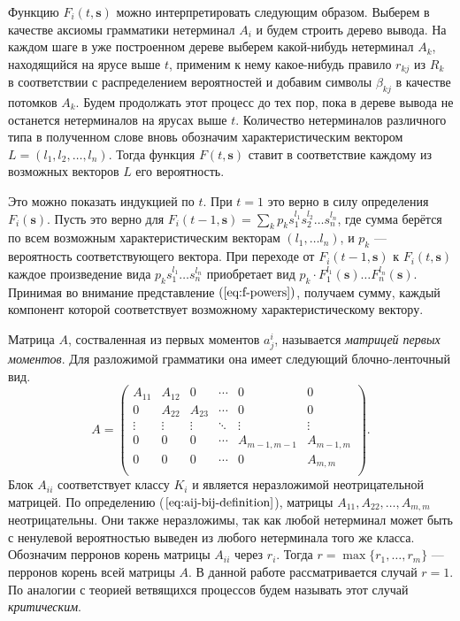 \documentclass[12pt]{article}
\begin{document}
Функцию $F_i(t, \mathbf{s})$ можно интерпретировать следующим образом. Выберем в качестве аксиомы грамматики нетерминал $A_i$ и будем строить дерево вывода. На каждом шаге в уже построенном дереве выберем какой-нибудь нетерминал $A_k$, находящийся на ярусе выше $t$, применим к нему какое-нибудь правило $r_{kj}$ из $R_k$ в соответствии с распределением вероятностей и добавим символы $\beta_{kj}$ в качестве потомков $A_k$. Будем продолжать этот процесс до тех пор, пока в дереве вывода не останется нетерминалов на ярусах выше $t$. Количество нетерминалов различного типа в полученном слове вновь обозначим характеристическим вектором $L = (l_1, l_2, \ldots, l_n)$. Тогда функция $F(t, \mathbf{s})$ ставит в соответствие каждому из возможных векторов $L$ его вероятность.

Это можно показать индукцией по $t$. При $t = 1$ это верно в силу определения $F_i(\mathbf{s})$. Пусть это верно для $F_i(t-1, \mathbf{s}) = \sum_k p_k s_1^{l_1} s_2^{l_2} \ldots s_n^{l_n}$, где сумма берётся по всем возможным характеристическим векторам $(l_1, \ldots l_n)$, и $p_k$ --- вероятность соответствующего вектора. При переходе от $F_i(t-1, \mathbf{s})$ к $F_i(t, \mathbf{s})$ каждое произведение вида $p_k s_1^{l_1} \ldots s_n^{l_n}$ приобретает вид $p_k \cdot F_1^{l_1}(\mathbf{s}) \ldots F_n^{l_n}(\mathbf{s})$. Принимая во внимание представление $(\ref{eq:f-powers})$, получаем сумму, каждый компонент которой соответствует возможному характеристическому вектору.

Матрица $A$, состваленная из первых моментов $a^i_j$, называется \textit{матрицей первых моментов}. Для разложимой грамматики она имеет следующий блочно-ленточный вид.
\begin{equation}
\label{eq:amatrix}
	A =
	\begin{pmatrix}
		A_{11} & A_{12} & 0      & \cdots & 0           & 0          \\
		0      & A_{22} & A_{23} & \cdots & 0           & 0          \\ 
		\vdots & \vdots & \vdots & \ddots & \vdots      & \vdots     \\
		0      & 0      & 0      & \cdots & A_{m-1,m-1} & A_{m-1, m} \\
		0      & 0      & 0      & \cdots & 0           & A_{m,m}    \\
	\end{pmatrix}.
\end{equation}
Блок $A_{ii}$ соответствует классу $K_i$ и является неразложимой неотрицательной матрицей. По определению ($\ref{eq:aij-bij-definition}$), матрицы $A_{11}, A_{22}, \ldots, A_{m,m}$ неотрицательны. Они также неразложимы, так как любой нетерминал может быть с ненулевой вероятностью выведен из любого нетерминала того же класса. Обозначим перронов корень \cite{gantmaher-matrix-theory} матрицы $A_{ii}$ через $r_i$. Тогда $r = \max\{r_1, \ldots, r_m\}$ --- перронов корень всей матрицы $A$. В данной работе рассматривается случай $r = 1$. По аналогии с теорией ветвящихся процессов \cite{sevast-processes} будем называть этот случай \textit{критическим}.
\end{document}
